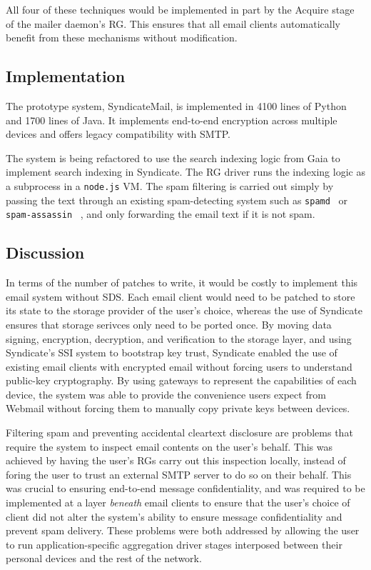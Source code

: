 All four of these techniques would be implemented in part by the Acquire stage of the
mailer daemon's RG.  This ensures that all email clients automatically benefit
from these mechanisms without modification.

\subsection{Implementation}

The prototype system, SyndicateMail, is implemented in 4100 lines of Python and
1700 lines of Java.  It implements end-to-end encryption across multiple devices
and offers legacy compatibility with SMTP.

The system is being refactored to use the search indexing
logic from Gaia to implement search indexing in Syndicate.  The RG
driver runs the indexing logic as a subprocess in a \texttt{node.js} VM.  The
spam filtering is carried out simply by passing the text through an existing
spam-detecting system such as \texttt{spamd}~\cite{spamd} or \texttt{spam-assassin}
~\cite{spam-assassin}, and only forwarding the email text if it is not spam.

\subsection{Discussion}

In terms of the number of patches to write, it would be costly to implement this email system without
SDS.  Each email client would need to be patched to store its state to the
storage provider of the user's choice, whereas the use of Syndicate ensures that
storage serivces only need to be ported once.  By moving data signing,
encryption, decryption, and verification to the storage layer, 
and using Syndicate's SSI system to bootstrap key trust, Syndicate enabled the
use of existing email clients with encrypted email without forcing
users to understand public-key cryptography.  By using gateways to represent the
capabilities of each device, the system was able to provide the convenience users expect from Webmail
without forcing them to manually copy private keys between devices.

Filtering spam and preventing accidental cleartext disclosure are problems
that require the system to inspect email contents on the user's behalf.  This
was achieved by having the user's RGs carry out this inspection locally,
instead of foring the user to trust an external SMTP server to do so on their
behalf.  This was crucial to ensuring end-to-end message confidentiality, and
was required to be implemented at a layer \emph{beneath} email clients to ensure
that the user's choice of client did not alter the system's ability to ensure
message confidentiality and prevent spam delivery.  These problems
were both addressed by allowing the user to run application-specific aggregation driver
stages interposed between their personal devices and the rest of the network.

